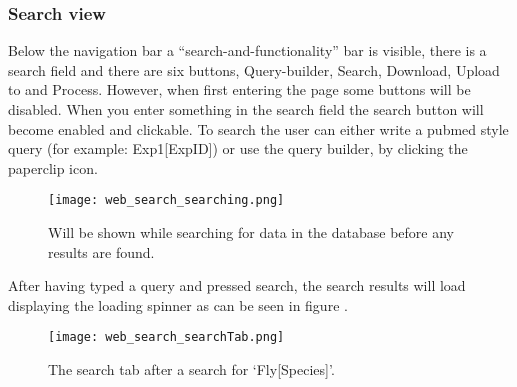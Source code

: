 \subsubsection{Search view}

Below the navigation bar a “search-and-functionality” bar is visible, there is a search field and there are six buttons, Query-builder, Search, Download, Upload to and Process. However, when first entering the page some buttons will be disabled. When you enter something in the search field the search button will become enabled and clickable. To search the user can either write a pubmed style query (for example: Exp1[ExpID]) or use the query builder, by clicking the paperclip icon.

\begin{sidewaysfigure}[h]
\centering
\texttt{[image: web\_search\_searching.png]}
\caption{\label{fig:web_search_searching}Will be shown while searching for data in the database before any results are found.}
\end{sidewaysfigure}

After having typed a query and pressed search, the search results will load displaying the loading spinner as can be seen in figure .
\begin{sidewaysfigure}[h]
\centering
\texttt{[image: web\_search\_searchTab.png]}
\caption{\label{fig:web_search_searchTab}The search tab after a search for ‘Fly[Species]’.}
\end{sidewaysfigure}

